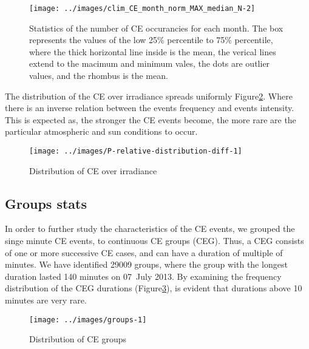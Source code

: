 \documentclass[
]{article}
\begin{document}
\begin{figure}[h!]

{\centering \texttt{[image: ../images/clim\_CE\_month\_norm\_MAX\_median\_N-2]} 

}

\caption{Statistics of the number of CE occurancies for each month. The box represents the values of the low 25\% percentile to 75\% percentile, where the thick horizontal line inside is the mean, the verical lines extend to the macimum and minimum vales, the dots are outlier values, and the rhombus is the mean.}\label{fig:relative-month-occurancies}
\end{figure}

The distribution of the CE over irradiance spreads uniformly
Figure\nobreakspace{}\ref{fig:ovir-distribution}. Where there is an inverse relation
between the events frequency and events intensity. This is expected as, the stronger
the CE events become, the more rare are the particular atmospheric and sun conditions
to occur.

\begin{figure}[h!]

{\centering \texttt{[image: ../images/P-relative-distribution-diff-1]} 

}

\caption{Distribution of CE over irradiance}\label{fig:ovir-distribution}
\end{figure}

\FloatBarrier

\hypertarget{groups-stats}{%
\subsection{Groups stats}\label{groups-stats}}

In order to further study the characteristics of the CE events, we grouped the singe
minute CE events, to continuous CE groups (CEG). Thus, a CEG consists of one or more
successive CE cases, and can have a duration of multiple of minutes. We have
identified 29009 groups, where the group with the longest duration lasted
140 minutes on
07~July 2013.
By examining the frequency distribution of the CEG durations
(Figure\nobreakspace{}\ref{fig:ceg-duration-distribution}), is evident that durations above
10 minutes are very rare.

\begin{figure}[h!]

{\centering \texttt{[image: ../images/groups-1]} 

}

\caption{Distribution of CE groups}\label{fig:ceg-duration-distribution}
\end{figure}
\end{document}
